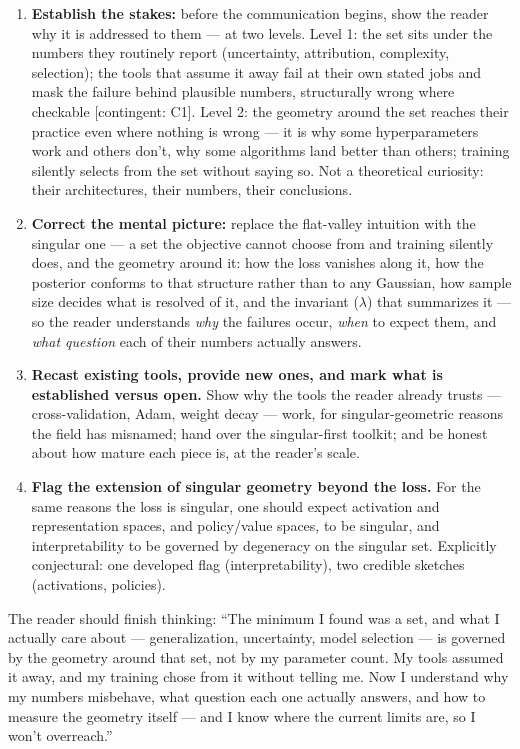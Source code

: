 \documentclass[11pt]{article}
\begin{document}
\begin{enumerate}[nosep, label=(\roman*)]
\item \textbf{Establish the stakes:} before the communication begins,
      show the reader why it is addressed to them --- at two levels.
      Level 1: the set sits under the numbers they routinely report
      (uncertainty, attribution, complexity, selection); the tools that
      assume it away fail at their own stated jobs and mask the failure
      behind plausible numbers, structurally wrong where checkable
      [contingent: C1]. Level 2: the geometry around the set reaches
      their practice even where nothing is wrong --- it is why some
      hyperparameters work and others don't, why some algorithms land
      better than others; training silently selects from the set
      without saying so. Not a theoretical curiosity: their
      architectures, their numbers, their conclusions.
\item \textbf{Correct the mental picture:} replace the flat-valley
      intuition with the singular one --- a set the objective cannot
      choose from and training silently does, and the geometry around
      it: how the loss vanishes along it, how the posterior conforms to
      that structure rather than to any Gaussian, how sample size
      decides what is resolved of it, and the invariant ($\lambda$)
      that summarizes it --- so the reader understands \emph{why} the
      failures occur, \emph{when} to expect them, and \emph{what
      question} each of their numbers actually answers.
\item \textbf{Recast existing tools, provide new ones, and mark what
      is established versus open.} Show why the tools the reader
      already trusts --- cross-validation, Adam, weight decay --- work,
      for singular-geometric reasons the field has misnamed; hand over
      the singular-first toolkit; and be honest about how mature each
      piece is, at the reader's scale.
\item \textbf{Flag the extension of singular geometry beyond the
      loss.} For the same reasons the loss is singular, one should
      expect activation and representation spaces, and policy/value
      spaces, to be singular, and interpretability to be governed by
      degeneracy on the singular set. Explicitly conjectural: one
      developed flag (interpretability), two credible sketches
      (activations, policies).
\end{enumerate}

The reader should finish thinking: ``The minimum I found was a set,
and what I actually care about --- generalization, uncertainty, model
selection --- is governed by the geometry around that set, not by my
parameter count. My tools assumed it away, and my training chose from
it without telling me. Now I understand why my numbers misbehave, what
question each one actually answers, and how to measure the geometry
itself --- and I know where the current limits are, so I won't
overreach.''
\end{document}
